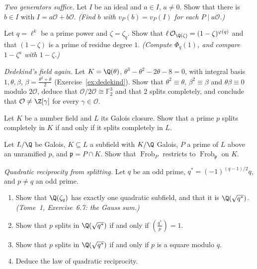 \begin{exercise}[$\star\star$]\label{ex:twogen}
\emph{Two generators suffice.} Let $I$ be an ideal and $a\in I$, $a\ne0$. Show that there is $b\in I$ with $I=a\mathcal
O+b\mathcal O$. \emph{(Find $b$ with $v_P(b)=v_P(I)$ for each $P\mid a\mathcal O$.)}
\end{exercise}

\begin{exercise}[$\star\star$]\label{ex:totram}
Let $q=\ell^k$ be a prime power and $\zeta=\zeta_q$. Show that $\ell\,\mathcal O_{\Q(\zeta)}=(1-\zeta)^{\varphi(q)}$ and
that $(1-\zeta)$ is a prime of residue degree $1$. \emph{(Compute $\Phi_q(1)$, and compare $1-\zeta^a$ with $1-\zeta$.)}
\end{exercise}

\begin{exercise}[$\star\star$]\label{ex:dedekindfield}
\emph{Dedekind's field again.} Let $K=\Q(\theta)$, $\theta^3-\theta^2-2\theta-8=0$, with integral basis $1,\theta,\beta$,
$\beta=\frac{\theta^2+\theta}2$ (Exercise~\ref{ex:dedekind}). Show that $\theta^2\equiv\theta$, $\beta^2\equiv\beta$ and
$\theta\beta\equiv0$ modulo $2\mathcal O$, deduce that $\mathcal O/2\mathcal O\cong\mathbb F_2^3$ and that $2$ splits
completely, and conclude that $\mathcal O\ne\Z[\gamma]$ for every $\gamma\in\mathcal O$.
\end{exercise}

\begin{exercise}[$\star\star$]\label{ex:closure}
Let $K$ be a number field and $L$ its Galois closure. Show that a prime $p$ splits completely in $K$ if and only if it
splits completely in $L$.
\end{exercise}

\begin{exercise}[$\star\star$]\label{ex:frobsub}
Let $L/\Q$ be Galois, $K\subseteq L$ a subfield with $K/\Q$ Galois, $P$ a prime of $L$ above an unramified $p$, and
$\mathfrak p=P\cap K$. Show that $\operatorname{Frob}_P$ restricts to $\operatorname{Frob}_{\mathfrak p}$ on $K$.
\end{exercise}

\begin{exercise}[$\star\star\star$]\label{ex:qrsplit}
\emph{Quadratic reciprocity from splitting.} Let $q$ be an odd prime, $q^*=(-1)^{(q-1)/2}q$, and $p\ne q$ an odd prime.
\begin{enumerate}[label=(\alph*)]
\item Show that $\Q(\zeta_q)$ has exactly one quadratic subfield, and that it is $\Q(\sqrt{q^*})$. \emph{(Tome~1,
Exercise~6.7: the Gauss sum.)}
\item Show that $p$ splits in $\Q(\sqrt{q^*})$ if and only if $\left(\frac{q^*}p\right)=1$.
\item Show that $p$ splits in $\Q(\sqrt{q^*})$ if and only if $p$ is a square modulo $q$.
\item Deduce the law of quadratic reciprocity.
\end{enumerate}
\end{exercise}

